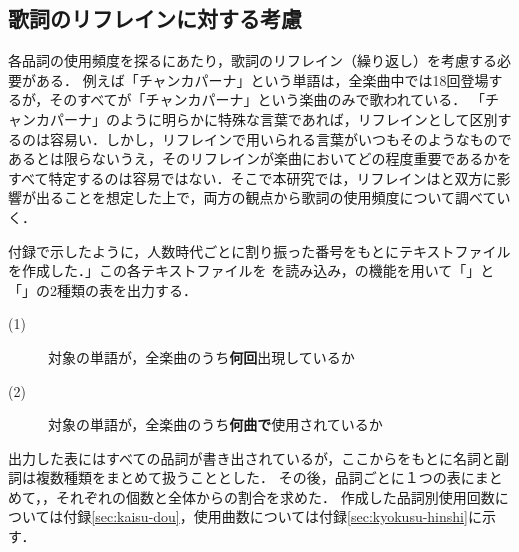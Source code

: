 
\subsection{歌詞のリフレインに対する考慮}\label{sec:refrain}
各品詞の使用頻度を探るにあたり，歌詞のリフレイン（繰り返し）を考慮する必要がある．
%
例えば「チャンカパーナ」という単語は，全楽曲中では18回登場するが，そのすべてが「チャンカパーナ」という楽曲のみで歌われている．
「チャンカパーナ」のように明らかに特殊な言葉であれば，リフレインとして区別するのは容易い．しかし，リフレインで用いられる言葉がいつもそのようなものであるとは限らないうえ，そのリフレインが楽曲においてどの程度重要であるかをすべて特定するのは容易ではない．そこで本研究では，リフレインは\kaisu と\kyokusu 双方に影響が出ることを想定した上で，両方の観点から歌詞の使用頻度について調べていく．

付録で示したように，人数時代ごとに割り振った番号をもとにテキストファイルを作成した．」この各テキストファイルを
を読み込み，\khcoder の機能を用いて「\kaisu 」と「\kyokusu 」の2種類の表を出力する．

\begin{description}
	\item[(1) \kaisu] 対象の単語が，全楽曲のうち\textbf{何回}出現しているか
	\item[(2) \kyokusu] 対象の単語が，全楽曲のうち\textbf{何曲で}使用されているか
\end{description}


出力した表にはすべての品詞が書き出されているが，ここからをもとに名詞と副詞は複数種類をまとめて扱うこととした．
その後，品詞ごとに１つの表にまとめて，\kaisu，\kyokusu それぞれの個数と全体からの割合を求めた．
作成した品詞別使用回数については付録\ref{sec:kaisu-dou}，使用曲数については付録\ref{sec:kyokusu-hinshi}に示す．


